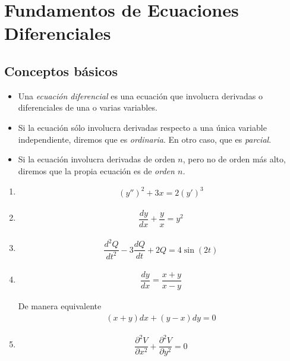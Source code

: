 \section{Fundamentos de Ecuaciones Diferenciales}

\subsection{Conceptos básicos}

\begin{itemize}
	\item 	Una \emph{ecuación diferencial} es una ecuación que involucra derivadas o diferenciales de una o varias variables.
	\item Si la ecuación sólo involucra derivadas respecto a una única variable independiente, diremos que es \emph{ordinaria}.  En otro caso, que es \emph{parcial}.
	\item Si la ecuación involucra derivadas de orden $n$, pero no de orden más alto, diremos que la propia ecuación es de \emph{orden $n$.}
\end{itemize}

\begin{resuelto}

\begin{enumerate}
	\item
		\label{exmp 02_01}
		\begin{align*}
		\left(y''\right)^{2}+3x=2\left(y'\right)^3
		\end{align*}
	\item
		\label{exmp 02:02}
		\begin{align*}
		\dfrac{dy}{dx}+\dfrac{y}{x} = y^2
		\end{align*}
	\item
	\label{exmp 02:03}
		\begin{align*}
			\dfrac{d^{2}Q}{dt^{2}}-3\dfrac{dQ}{dt}+2Q = 4\sin(2t)
		\end{align*}
	\item
		\label{exmp 02:04}
		\begin{align*}
			\dfrac{dy}{dx}=\dfrac{x+y}{x-y}
		\end{align*}

		De manera equivalente
		\begin{align*}
			(x+y)dx+(y-x)dy = 0
		\end{align*}
	\item
		\begin{align*}
			\dfrac{\partial^{2}V}{\partial x^{2}} +
			\dfrac{\partial^{2}V}{\partial y^{2}} = 0
		\end{align*}
\end{enumerate}

\end{resuelto}
